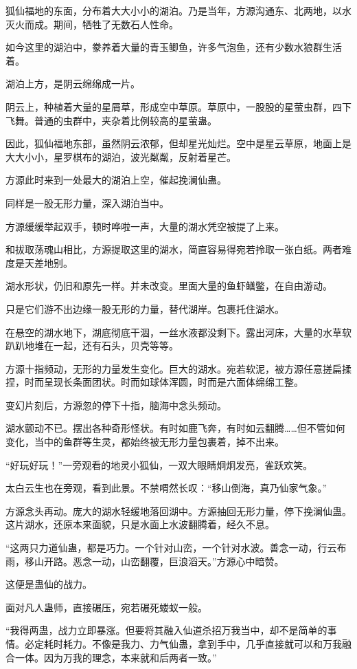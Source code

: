\begin{this_body}
狐仙福地的东面，分布着大大小小的湖泊。乃是当年，方源沟通东、北两地，以水灭火而成。期间，牺牲了无数石人性命。

如今这里的湖泊中，豢养着大量的青玉鲫鱼，许多气泡鱼，还有少数水狼群生活着。

湖泊上方，是阴云绵绵成一片。

阴云上，种植着大量的星屑草，形成空中草原。草原中，一股股的星萤虫群，四下飞舞。普通的虫群中，夹杂着比例较高的星萤蛊。

因此，狐仙福地东部，虽然阴云浓郁，但却星光灿烂。空中是星云草原，地面上是大大小小，星罗棋布的湖泊，波光粼粼，反射着星芒。

方源此时来到一处最大的湖泊上空，催起挽澜仙蛊。

同样是一股无形力量，深入湖泊当中。

方源缓缓举起双手，顿时哗啦一声，大量的湖水凭空被提了上来。

和拔取荡魂山相比，方源提取这里的湖水，简直容易得宛若拎取一张白纸。两者难度是天差地别。

湖水形状，仍旧和原先一样。并未改变。里面大量的鱼虾鳝鳖，在自由游动。

只是它们游不出边缘一股无形的力量，替代湖岸。包裹托住湖水。

在悬空的湖水地下，湖底彻底干涸，一丝水液都没剩下。露出河床，大量的水草软趴趴地堆在一起，还有石头，贝壳等等。

方源十指频动，无形的力量发生变化。巨大的湖水。宛若软泥，被方源任意搓扁揉捏，时而呈现长条面团状。时而如球体浑圆，时而是六面体绵绵工整。

变幻片刻后，方源忽的停下十指，脑海中念头频动。

湖水颤动不已。摆出各种奇形怪状。有时如鹿飞奔，有时如云翻腾……但不管如何变化，当中的鱼群等生灵，都始终被无形力量包裹着，掉不出来。

“好玩好玩！”一旁观看的地灵小狐仙，一双大眼睛炯炯发亮，雀跃欢笑。

太白云生也在旁观，看到此景。不禁喟然长叹：“移山倒海，真乃仙家气象。”

方源念头再动。庞大的湖水轻缓地落回湖中。方源抽回无形力量，停下挽澜仙蛊。这片湖水，还原本来面貌，只是水面上水波翻腾着，经久不息。

“这两只力道仙蛊，都是巧力。一个针对山峦，一个针对水波。善念一动，行云布雨，移山开路。恶念一动，山峦翻覆，巨浪滔天。”方源心中暗赞。

这便是蛊仙的战力。

面对凡人蛊师，直接碾压，宛若碾死蝼蚁一般。

“我得两蛊，战力立即暴涨。但要将其融入仙道杀招万我当中，却不是简单的事情。必定耗时耗力。不像是我力、力气仙蛊，拿到手中，几乎直接就可以和万我融合一体。因为万我的理念，本来就和后两者一致。”


\end{this_body}
